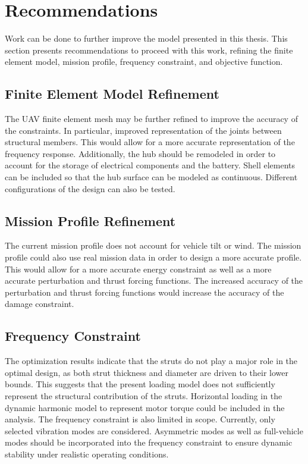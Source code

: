\documentclass[doublespace,nopageskip]{VTthesis}
\begin{document}
{	\section{Recommendations} \label{se:recommend}
	
	 Work can be done to further improve the model presented in this thesis. This section presents recommendations to proceed with this work, refining the finite element model, mission profile, frequency constraint, and objective function. 
	
	\subsection{Finite Element Model Refinement}
	
 	The UAV finite element mesh may be further refined to improve the accuracy of the constraints. In particular, improved representation of the joints between structural members. This would allow for a more accurate representation of the frequency response. Additionally, the hub should be remodeled in order to account for the storage of electrical components and the battery. Shell elements can be included so that the hub surface can be modeled as continuous. Different configurations of the design can also be tested.
	
	\subsection{Mission Profile Refinement}
	
	The current mission profile does not account for vehicle tilt or wind. The mission profile could also use real mission data in order to design a more accurate profile. This would allow for a more accurate energy constraint as well as a more accurate perturbation and thrust forcing functions. The increased accuracy of the perturbation and thrust forcing functions would increase the accuracy of the damage constraint.
	
	\subsection{Frequency Constraint}
	
	The optimization results indicate that the struts do not play a major role in the optimal design, as both strut thickness and diameter are driven to their lower bounds. This suggests that the present loading model does not sufficiently represent the structural contribution of the struts. Horizontal loading in the dynamic harmonic model to represent motor torque could be included in the analysis. The frequency constraint is also limited in scope. Currently, only selected vibration modes are considered. Asymmetric modes as well as full-vehicle modes should be incorporated into the frequency constraint to ensure dynamic stability under realistic operating conditions.
	
}
\end{document}
